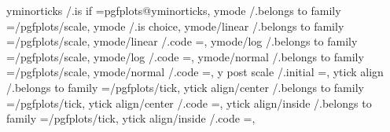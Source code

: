 {{{{{{{{{{{yminorticks                   /.is if                                                                                                                            =pgfplots@yminorticks,
ymode                         /.belongs to family                                                                                                                =/pgfplots/scale,
ymode                         /.is choice,                                                                                                                 
ymode/linear                  /.belongs to family                                                                                                                =/pgfplots/scale,
ymode/linear                  /.code                                                                                                                             ={\pgfplots@yislineartrue},
ymode/log                     /.belongs to family                                                                                                                =/pgfplots/scale,
ymode/log                     /.code                                                                                                                             ={\pgfplots@yislinearfalse},
ymode/normal                  /.belongs to family                                                                                                                =/pgfplots/scale,
ymode/normal                  /.code                                                                                                                             ={\pgfplots@yislineartrue},
y post scale                  /.initial                                                                                                                          =,
ytick align                   /.belongs to family                                                                                                                =/pgfplots/tick,
ytick align/center            /.belongs to family                                                                                                                =/pgfplots/tick,
ytick align/center            /.code                                                                                                                             ={\def\pgfplots@ytickalignnum{2}},
ytick align/inside            /.belongs to family                                                                                                                =/pgfplots/tick,
ytick align/inside            /.code                                                                                                                             ={\def\pgfplots@ytickalignnum{0}},
}}}}}}}}}}}
